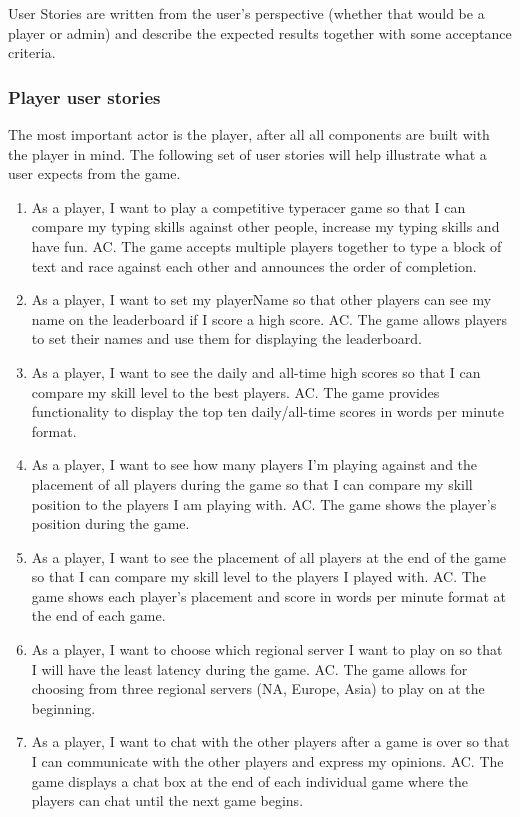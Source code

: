 \documentclass[titlepage]{article}
\begin{document}
User Stories are written from the user's perspective (whether that would be a player or admin) and describe the expected results together with some acceptance criteria.

\subsubsection{Player user stories}

The most important actor is the player, after all all components are built with the player in mind. The following set of user stories will help illustrate what a user expects from the game.

\newcommand{\AC}{\subitem AC. }

\begin{enumerate}
	\item
	      As a player, I want to play a competitive typeracer game so that I can compare my typing skills against other people, increase my typing skills and have fun.
	      \AC
	      The game accepts multiple players together to type a block of text and race against each other and announces the order of completion.

	\item
	      As a player, I want to set my playerName so that other players can see my name on the leaderboard if I score a high score.
	      \AC
	      The game allows players to set their names and use them for displaying the leaderboard.

	\item
	      As a player, I want to see the daily and all-time high scores so that I can compare my skill level to the best players.
	      \AC
	      The game provides functionality to display the top ten daily/all-time scores in words per minute format.

	\item
	      As a player, I want to see how many players I'm playing against and the placement of all players during the game so that I can compare my skill position to the players I am playing with.
	      \AC
	      The game shows the player's position during the game.

	\item
	      As a player, I want to see the placement of all players at the end of the game so that I can compare my skill level to the players I played with.
	      \AC
	      The game shows each player's placement and score in words per minute format at the end of each game.

	\item
	      As a player, I want to choose which regional server I want to play on so that I will have the least latency during the game.
	      \AC
	      The game allows for choosing from three regional servers (NA, Europe, Asia) to play on at the beginning.

	\item
	      As a player, I want to chat with the other players after a game is over so that I can communicate with the other players and express my opinions.
	      \AC
	      The game displays a chat box at the end of each individual game where the players can chat until the next game begins.
\end{enumerate}
\end{document}
